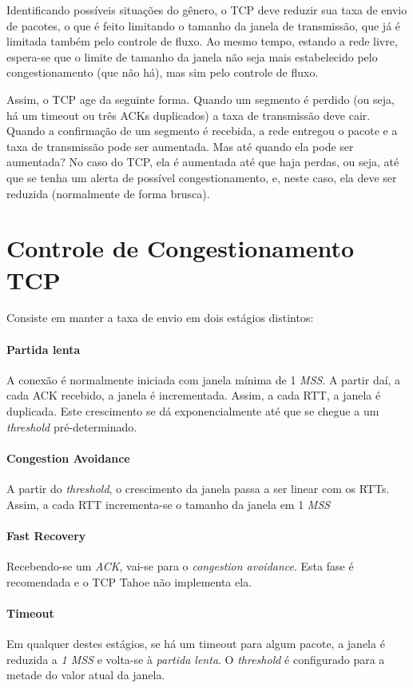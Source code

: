 Identificando possíveis situações do gênero, o TCP deve reduzir sua taxa de envio de pacotes, o que é feito limitando o tamanho da janela de transmissão,
que já é limitada também pelo controle de fluxo.
Ao mesmo tempo, estando a rede livre, espera-se que o limite de tamanho da janela não seja mais estabelecido pelo congestionamento (que não há),
mas sim pelo controle de fluxo.

Assim, o TCP age da seguinte forma.
Quando um segmento é perdido (ou seja, há um timeout ou três ACKs duplicados) a taxa de transmissão deve cair.
Quando a confirmação de um segmento é recebida, a rede entregou o pacote e a taxa de transmissão pode ser aumentada.
Mas até quando ela pode ser aumentada? No caso do TCP, ela é aumentada até que haja perdas, ou seja, até que se tenha um alerta de possível congestionamento, e, neste caso, ela deve ser reduzida (normalmente de forma brusca).

\section{Controle de Congestionamento TCP}

Consiste em manter a taxa de envio em dois estágios distintos:

\paragraph{Partida lenta} A conexão é normalmente iniciada com janela mínima de 1 \emph{MSS}. A partir daí, a cada ACK recebido, a janela é incrementada. Assim, a cada RTT, a janela é duplicada. Este crescimento se dá exponencialmente até que se chegue a um \emph{threshold} pré-determinado.

\paragraph{Congestion Avoidance} A partir do \emph{threshold}, o crescimento da janela passa a ser linear com os RTTs. Assim, a cada RTT incrementa-se o tamanho da janela em 1 \emph{MSS}

\paragraph{Fast Recovery} Recebendo-se um \emph{ACK}, vai-se para o \emph{congestion avoidance}. Esta fase é recomendada e o TCP Tahoe não implementa ela.

\paragraph{Timeout} Em qualquer destes estágios, se há um timeout para algum pacote, a janela é reduzida a \emph{1 MSS} e volta-se à \emph{partida lenta}. 
O \emph{threshold} é configurado para a metade do valor atual da janela.

